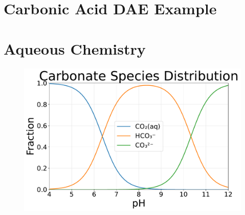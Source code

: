 \documentclass{beamer}
\begin{document}
\begin{frame}

\end{frame}

\section{Carbonic Acid DAE Example}

\section{Aqueous Chemistry}

\begin{frame}

\end{frame}

\begin{frame}

\end{frame}

\begin{frame}

\end{frame}

\begin{frame}
\begin{figure}
\includegraphics[scale=0.4]{../plots/carbonate_speciation.pdf}
\end{figure}
\end{frame}
\end{document}
